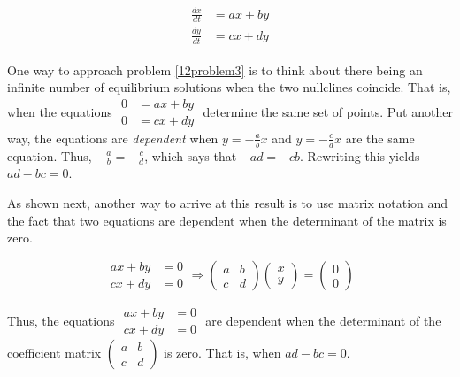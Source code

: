 \clearpage
{}
\begin{align*}\begin{split}
\frac{dx}{dt}&=ax+by\\ \frac{dy}{dt}&= cx+dy
\end{split}\end{align*}

One way to approach problem \ref{12problem3} is to think about there being an infinite number of equilibrium solutions when the two nullclines coincide. That is, when the equations  $\displaystyle
\begin{aligned}
0&=ax+by\\ 0&= cx+dy
\end{aligned}$ determine the same set of points. Put another way, the equations are \textit{dependent} when $\displaystyle y=-\frac{a}{b}x$ and $\displaystyle y=-\frac{c}{d}x$  are the same equation. Thus, $\displaystyle -\frac{a}{b}=-\frac{c}{d}$, which says that $-ad = -cb$. Rewriting this yields  $ad - bc = 0$.  

As shown next, another way to arrive at this result is to use matrix notation and the fact that two equations are dependent when the determinant of the matrix is zero. 

\[
\begin{matrix} ax+by &=0\\ cx+dy &=0 \end{matrix} 
\Longrightarrow \begin{pmatrix}a&b\\c&d\end{pmatrix}\begin{pmatrix}x\\y\end{pmatrix}=\begin{pmatrix}0\\0\end{pmatrix}
\]

Thus, the equations $ \begin{matrix} ax+by &=0\\ cx+dy &=0 \end{matrix}$ are dependent when the determinant of the coefficient matrix $\begin{pmatrix} a&b \\ c&d \end{pmatrix}$ is zero. That is, when $ad-bc=0$. \\ 

